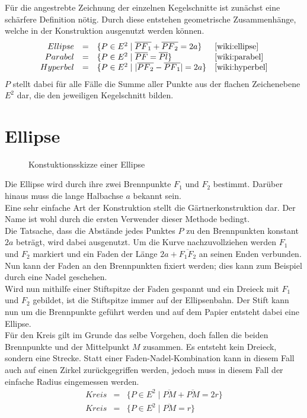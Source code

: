\setcounter{section}{0}
Für die angestrebte Zeichnung der einzelnen Kegelschnitte ist zunächst eine schärfere Definition nötig. Durch diese entstehen geometrische Zusammenhänge, welche in der Konstruktion ausgenutzt werden können.
\begin{displaymath}
	\begin{array}{rcll}
		Ellipse  & = & \{P\in E^2\;|\;\overline{{PF}_1} + \overline{{PF}_2} = 2a\} & \text{\cite{wiki:ellipse}}\\
		Parabel  & = & \{P\in E^2\;|\;\overline{PF} = \overline{Pl}\} & \text{\cite{wiki:parabel}}\\
		Hyperbel & = & \{P\in E^2\;|\;|\overline{{PF}_2} - \overline{{PF}_1}| = 2a\} & \text{\cite{wiki:hyperbel}}
	\end{array}
\end{displaymath}
$P$ stellt dabei für alle Fälle die Summe aller Punkte aus der flachen Zeichenebene $E^2$ dar, die den jeweiligen Kegelschnitt bilden.
\section{Ellipse}
\begin{figure}[h]
	\centering
		\resizebox{.5\linewidth}{!}{
			
		}
	\caption{Konstuktionsskizze einer Ellipse}
\end{figure}
Die Ellipse wird durch ihre zwei Brennpunkte ${F}_1$ und ${F}_2$ bestimmt. Darüber hinaus muss die lange Halbachse $a$ bekannt sein.\\
Eine sehr einfache Art der Konstruktion stellt die Gärtnerkonstruktion\cite[S.18]{Pensel:1993} dar. Der Name ist wohl durch die ersten Verwender dieser Methode bedingt.\\
Die Tatsache, dass die Abstände jedes Punktes $P$ zu den Brennpunkten konstant $2a$ beträgt, wird dabei ausgenutzt. Um die Kurve nachzuvollziehen werden ${F}_1$ und ${F}_2$ markiert und ein Faden der Länge $2a + \overline{{F}_1{F}_2}$ an seinen Enden verbunden. Nun kann der Faden an den Brennpunkten fixiert werden; dies kann zum Beispiel durch eine Nadel geschehen.\\
Wird nun mithilfe einer Stiftspitze der Faden gespannt und ein Dreieck mit ${F}_1$ und ${F}_2$ gebildet, ist die Stiftspitze immer auf der Ellipsenbahn. Der Stift kann nun um die Brennpunkte geführt werden und auf dem Papier entsteht dabei eine Ellipse.\\
Für den Kreis gilt im Grunde das selbe Vorgehen, doch fallen die beiden Brennpunkte und der Mittelpunkt $M$ zusammen. Es entsteht kein Dreieck, sondern eine Strecke. Statt einer Faden-Nadel-Kombination kann in diesem Fall auch auf einen Zirkel zurückgegriffen werden, jedoch muss in diesem Fall der einfache Radius eingemessen werden.
\begin{displaymath}
	\begin{array}{rcl}
		Kreis & = & \{P\in E^2\;|\;\overline{PM} + \overline{PM} = 2r\}\\
		Kreis & = & \{P\in E^2\;|\;\overline{PM} = r\}
	\end{array}
\end{displaymath}

